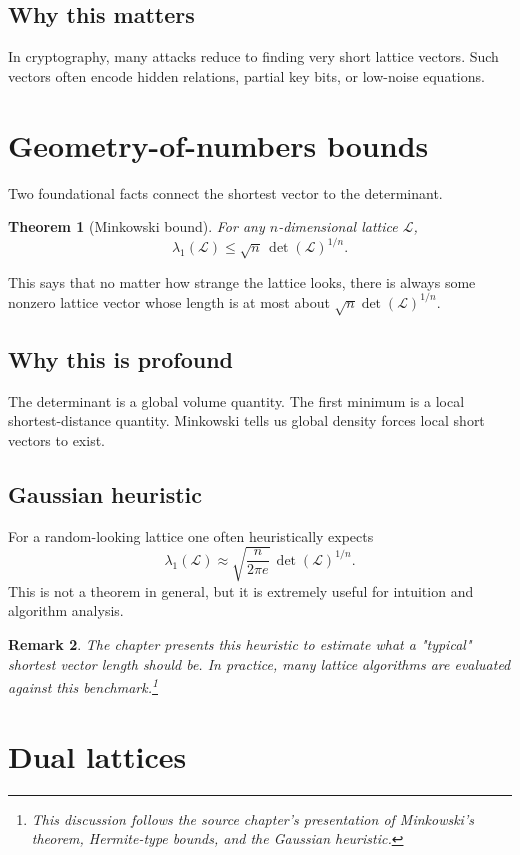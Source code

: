 \documentclass[11pt]{article}
\newtheorem{theorem}{Theorem}[section]
\newtheorem{remark}[theorem]{Remark}
\newcommand{\calL}{\mathcal{L}}
\begin{document}
\subsection{Why this matters}
In cryptography, many attacks reduce to finding very short lattice vectors. Such vectors often encode hidden relations, partial key bits, or low-noise equations.

\section{Geometry-of-numbers bounds}

Two foundational facts connect the shortest vector to the determinant.

\begin{theorem}[Minkowski bound]
For any $n$-dimensional lattice $\calL$,
\[
\lambda_1(\calL) \le \sqrt{n}\, \det(\calL)^{1/n}.
\]
\end{theorem}

This says that no matter how strange the lattice looks, there is always some nonzero lattice vector whose length is at most about $\sqrt{n}\det(\calL)^{1/n}$.

\subsection{Why this is profound}
The determinant is a global volume quantity. The first minimum is a local shortest-distance quantity. Minkowski tells us global density forces local short vectors to exist.

\subsection{Gaussian heuristic}
For a random-looking lattice one often heuristically expects
\[
\lambda_1(\calL) \approx \sqrt{\frac{n}{2\pi e}}\, \det(\calL)^{1/n}.
\]
This is not a theorem in general, but it is extremely useful for intuition and algorithm analysis.

\begin{remark}
The chapter presents this heuristic to estimate what a "typical" shortest vector length should be. In practice, many lattice algorithms are evaluated against this benchmark.\footnote{This discussion follows the source chapter's presentation of Minkowski's theorem, Hermite-type bounds, and the Gaussian heuristic.}
\end{remark}

\section{Dual lattices}
\end{document}
